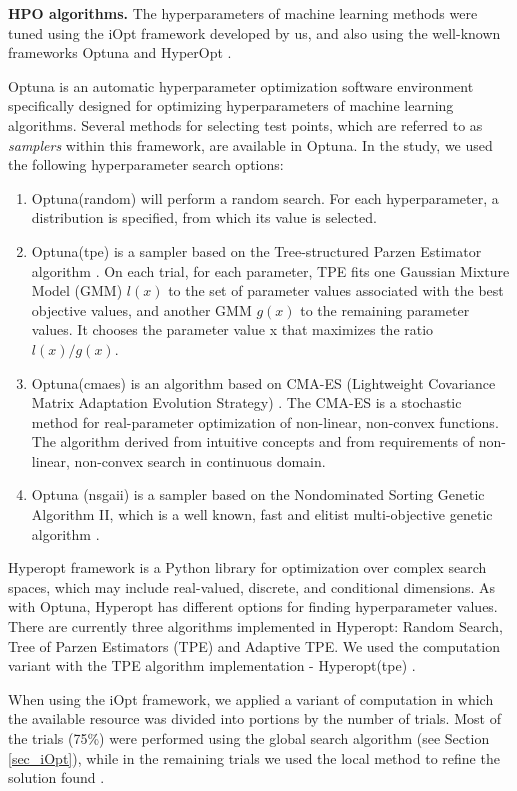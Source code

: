 \documentclass[preprint,12pt]{elsarticle}
\begin{document}
\textbf{HPO algorithms.} The hyperparameters of machine learning methods were tuned using the iOpt framework developed by us, and also using the well-known frameworks Optuna \cite{optuna} and HyperOpt \cite{hyperopt}.

Optuna is an automatic hyperparameter optimization software environment specifically designed for optimizing hyperparameters of machine learning algorithms. Several methods for selecting test points, which are referred to as \textit{samplers} within this framework, are available in Optuna.  In the study, we used the following hyperparameter search options:
\begin{enumerate}
	\item Optuna(random) will perform a random search. For each hyperparameter, a distribution is specified, from which its value is selected.
	\item Optuna(tpe) is a sampler based on the Tree-structured Parzen Estimator algorithm \cite{NIPS2011_86e8f7ab}. On each trial, for each parameter, TPE fits one Gaussian Mixture Model (GMM) $l(x)$ to the set of parameter values associated with the best objective values, and another GMM $g(x)$ to the remaining parameter values. It chooses the parameter value x that maximizes the ratio $l(x)/g(x)$.
	\item Optuna(cmaes) is an algorithm based on CMA-ES (Lightweight Covariance Matrix Adaptation Evolution Strategy) \cite{cmaes2015}. The CMA-ES is a stochastic method for real-parameter optimization of non-linear, non-convex functions. The algorithm derived from intuitive concepts and from requirements of non-linear, non-convex search in continuous domain.
	\item Optuna (nsgaii) is a sampler based on the Nondominated Sorting Genetic Algorithm II,  which is a well known, fast and elitist multi-objective genetic algorithm \cite{nsgaii2013}.

\end{enumerate}


Hyperopt framework is a Python library for optimization over complex search spaces, which may include real-valued, discrete, and conditional dimensions. As with Optuna, Hyperopt has different options for finding hyperparameter values. There are currently three algorithms implemented in Hyperopt: Random Search, Tree of Parzen Estimators (TPE) and Adaptive TPE. We used the computation variant with the TPE algorithm implementation - Hyperopt(tpe) \cite{NIPS2011_86e8f7ab}.

When using the iOpt framework, we applied a variant of computation in which the available resource was divided into portions by the number of trials. Most of the trials (75\%) were performed using the global search algorithm (see Section \ref{sec_iOpt}), while in the remaining trials we used the local method to refine the solution found \cite{Kelley}.
\end{document}
